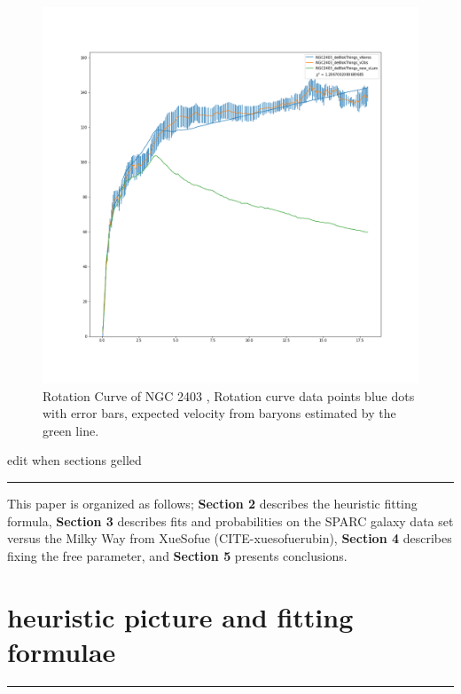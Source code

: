 \documentclass[reprint,%
 amsmath,amssymb,
 aps,
]{revtex4-1}
\begin{document}
 \begin{figure}[h!]
      \centering
      \includegraphics[width=\linewidth]{NGC2403_deBlokThings_XueSofue}
      \caption{Rotation Curve of NGC 2403 \cite{Blok1},  Rotation curve data points blue dots with  error bars, expected velocity from baryons estimated by the green line. }
      \label{fig:NGC2403}
  \end{figure}
  
       
  
 {\color{teal} edit when sections gelled}\\
 {\color{teal} \rule{\linewidth}{0.5mm}}
 
This paper  is organized as follows;
{\bf Section 2} describes the heuristic  fitting formula, 
{\bf Section 3} describes fits and probabilities on the
 SPARC galaxy data set versus    the Milky Way from  XueSofue (CITE-xuesofuerubin), 
 {\bf Section 4} describes fixing the free parameter,   and   
{\bf Section 5}  presents conclusions.     
  

   
 
   
 
 
 
  
 
\section{  heuristic picture and fitting formulae  \label{sec:dos}}
 {\color{teal} \rule{\linewidth}{0.5mm}}
 
\end{document}
